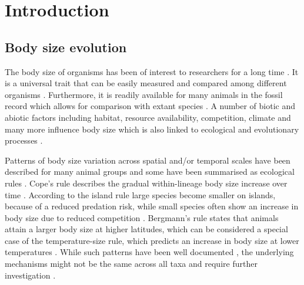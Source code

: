 \section{Introduction}
\subsection{Body size evolution}

The body size of organisms has been of interest to researchers for a long time \citep{Haldane1928,Peters1983}. It is a universal trait that can be easily measured and compared among different organisms \citep{.}. Furthermore, it is readily available for many animals in the fossil record which allows for comparison with extant species \citep{.}. A number of biotic and abiotic factors including habitat, resource availability, competition, climate and many more influence body size which is also linked to ecological and evolutionary processes \citep{Blackburn1994a,Blueweiss1978,Smith2009}.

Patterns of body size variation across spatial and/or temporal scales have been described for many animal groups and some have been summarised as ecological rules \citep{Millien2006,Angielczyk2015}.
Cope's rule describes the gradual within-lineage body size increase over time \citep{Cope1887}. According to the island rule large species become smaller on islands, because of a reduced predation risk, while small species often show an increase in body size due to reduced competition \citep{Foster1964}. Bergmann's rule \citep{Bergmann1848} states that animals attain a larger body size at higher latitudes, which can be considered a special case of the temperature-size rule, which predicts an increase in body size at lower temperatures \citep{AngillettaJr2004a}.
While such patterns have been well documented
\citep{Millien2006}, the underlying mechanisms might not be the same across all taxa and require further investigation \citep{Smith2009}.





